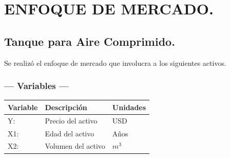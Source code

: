 \chapter{ENFOQUE DE MERCADO.} %

\section{Tanque para Aire Comprimido.} %
Se realizó el enfoque de mercado que involucra a los siguientes activos.

\subsection{\centering --- Variables ---} %
\begin{center}
  \begin{tabular}{|l|l|l|}
    \hline 
    Variable & Descripción   & Unidades\\ \hline 
    Y:  & Precio del activo  & USD \\ \hline 
    X1: & Edad del activo    & Años \\ \hline 
		X2: & Volumen del activo & \(m ^ 3\) \\ \hline 
  \end{tabular}
\end{center} 


